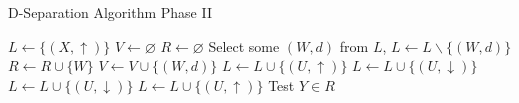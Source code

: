 \begin{frame}{D-Separation Algorithm Phase II}
\color{gray!90}
\begin{algorithm}[H]
\caption{D-Separation Phase II}
$L \leftarrow \{(X,\uparrow)\}$ 
$V \leftarrow \varnothing$ 
$R \leftarrow \varnothing$ 
{
    Select some $(W,d)$ from $L$, $L \leftarrow L \backslash \{(W,d)\}$\;
    {
    {
        $R \leftarrow R \cup \{W\}$ 
    }
    $V \leftarrow V \cup \{(W,d)\}$ 
    {
        {
            $L \leftarrow L \cup \{(U,\uparrow)\}$\;
        }
        {
            $L \leftarrow L \cup \{(U,\downarrow)\}$\;
        }
    } 
    {
    {
        {
            $L \leftarrow L \cup \{(U,\downarrow)\}$
        }
        {
            {
                $L \leftarrow L \cup \{(U,\uparrow)\}$
            }
        }
    }
    }
    }
}
Test $Y \in R$\;
\end{algorithm}
\end{frame}

